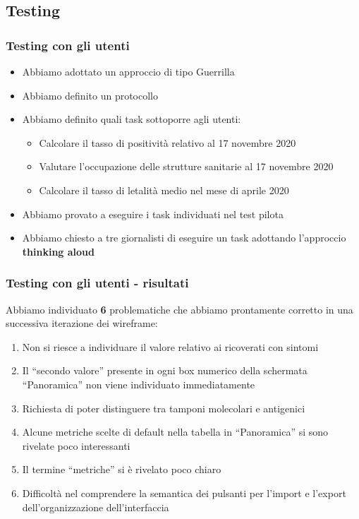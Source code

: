 \documentclass[handout]{beamer}
\begin{document}
		\subsection{Testing}
		\begin{frame}
			\frametitle{Testing con gli utenti}
			\begin{itemize}[<+->]
				\item Abbiamo adottato un approccio di tipo Guerrilla\\ 
				\item Abbiamo definito un protocollo\\
				\item Abbiamo definito quali task sottoporre agli utenti:
					\begin{itemize}[<+->]
						\item Calcolare il tasso di positività relativo al 17 novembre 2020\\
						\item Valutare l'occupazione delle strutture sanitarie al 17 novembre 2020\\
						\item Calcolare il tasso di letalità medio nel mese di aprile 2020\\
					\end{itemize}
				\item Abbiamo provato a eseguire i task individuati nel test pilota\\
				\item Abbiamo chiesto a tre giornalisti di eseguire un task adottando l'approccio \textbf{thinking aloud}\\
			\end{itemize}
		\end{frame}

		\begin{frame}
			\frametitle{Testing con gli utenti - risultati}
			Abbiamo individuato \textbf{6} problematiche che abbiamo prontamente corretto in una successiva iterazione dei wireframe:
			\begin{enumerate}[<+->]
				\item Non si riesce a individuare il valore relativo ai ricoverati con sintomi\\
				\item Il ``secondo valore'' presente in ogni box numerico della schermata ``Panoramica'' non viene individuato immediatamente\\
				\item Richiesta di poter distinguere tra tamponi molecolari e antigenici\\
				\item Alcune metriche scelte di default nella tabella in ``Panoramica'' si sono rivelate poco interessanti\\
				\item Il termine ``metriche'' si è rivelato poco chiaro\\
				\item Difficoltà nel comprendere la semantica dei pulsanti per l'import e l'export dell'organizzazione dell'interfaccia\\
			\end{enumerate}
		\end{frame}
\end{document}
